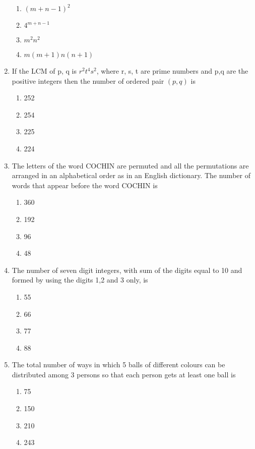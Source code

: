 \begin{enumerate}[label=\arabic*.,ref=\thesubsection.\theenumi]
\begin{enumerate}
\item $(m+n-1)^2$
\item $4^{m+n-1}$
\item $m^2n^2$
\item $m(m+1)n(n+1)$\\
\end{enumerate}
\item If the LCM of p, q is $r^2t^4s^2$, where r, s, t are prime numbers and p,q are the positive integers then the number of ordered pair $(p,q)$ is
\begin{enumerate}
\item 252
\item 254
\item 225
\item 224\\
\end{enumerate}
\item The letters of the word COCHIN are permuted and all the permutations are arranged in an alphabetical order as in an English dictionary. The number of words that appear before the word COCHIN is 
\begin{enumerate}
\item 360
\item 192
\item 96
\item 48\\
\end{enumerate}
\item The number of seven digit integers, with sum of the digits equal to 10 and formed by using the digits 1,2 and 3 only, is
\begin{enumerate}
\item 55
\item 66
\item 77
\item 88\\
\end{enumerate}
\item The total number of ways in which 5 balls of different colours can be distributed among 3 persons so that each person gets at least one ball is 
\begin{enumerate}
\item 75
\item 150
\item 210
\item 243\\

\end{enumerate}
\end{enumerate}
